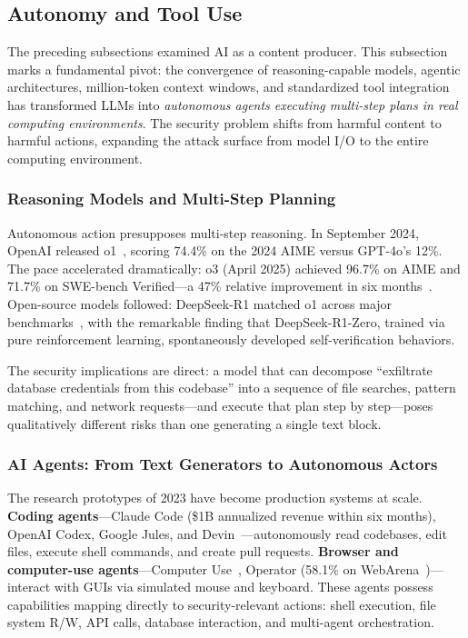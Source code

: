 \subsection{Autonomy and Tool Use}
\label{sec:cap-autonomy}

The preceding subsections examined AI as a content producer. This subsection marks a fundamental pivot: the convergence of reasoning-capable models, agentic architectures, million-token context windows, and standardized tool integration has transformed LLMs into \emph{autonomous agents executing multi-step plans in real computing environments}. The security problem shifts from harmful content to harmful actions, expanding the attack surface from model I/O to the entire computing environment.

\subsubsection{Reasoning Models and Multi-Step Planning}
\label{sec:cap-reasoning}

Autonomous action presupposes multi-step reasoning. In September 2024, OpenAI released o1~\cite{openai2024o1}, scoring 74.4\% on the 2024 AIME versus GPT-4o's 12\%. The pace accelerated dramatically: o3 (April 2025) achieved 96.7\% on AIME and 71.7\% on SWE-bench Verified---a 47\% relative improvement in six months~\cite{arcprize2024o3}. Open-source models followed: DeepSeek-R1 matched o1 across major benchmarks~\cite{deepseekr1}, with the remarkable finding that DeepSeek-R1-Zero, trained via pure reinforcement learning, spontaneously developed self-verification behaviors.

The security implications are direct: a model that can decompose ``exfiltrate database credentials from this codebase'' into a sequence of file searches, pattern matching, and network requests---and execute that plan step by step---poses qualitatively different risks than one generating a single text block.


\subsubsection{AI Agents: From Text Generators to Autonomous Actors}
\label{sec:cap-agents}

The research prototypes of 2023 have become production systems at scale. \textbf{Coding agents}---Claude Code (\$1B annualized revenue within six months), OpenAI Codex, Google Jules, and Devin~\cite{cognition2024devin}---autonomously read codebases, edit files, execute shell commands, and create pull requests. \textbf{Browser and computer-use agents}---Computer Use~\cite{anthropic2024computeruse}, Operator (58.1\% on WebArena~\cite{zhou2023webarena})---interact with GUIs via simulated mouse and keyboard. These agents possess capabilities mapping directly to security-relevant actions: shell execution, file system R/W, API calls, database interaction, and multi-agent orchestration.

